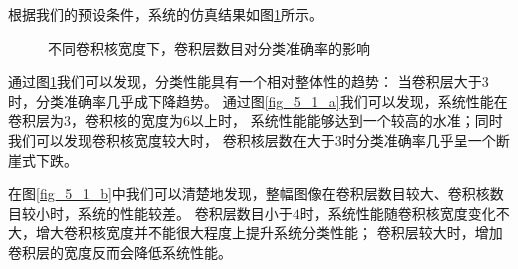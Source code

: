 根据我们的预设条件，系统的仿真结果如图\ref{fig_5_1}所示。\par
\begin{figure}[!h]
	\centering
	\caption{不同卷积核宽度下，卷积层数目对分类准确率的影响}
	\label{fig_5_1}
\end{figure}

通过图\ref{fig_5_1}我们可以发现，分类性能具有一个相对整体性的趋势：
当卷积层大于3时，分类准确率几乎成下降趋势。
通过图\ref{fig_5_1_a}我们可以发现，系统性能在卷积层为$3$，卷积核的宽度为$6$以上时，
系统性能能够达到一个较高的水准；同时我们可以发现卷积核宽度较大时，
卷积核层数在大于$3$时分类准确率几乎呈一个断崖式下跌。\par

在图\ref{fig_5_1_b}中我们可以清楚地发现，整幅图像在卷积层数目较大、卷积核数目较小时，系统的性能较差。
卷积层数目小于$4$时，系统性能随卷积核宽度变化不大，增大卷积核宽度并不能很大程度上提升系统分类性能；
卷积层较大时，增加卷积层的宽度反而会降低系统性能。\par

